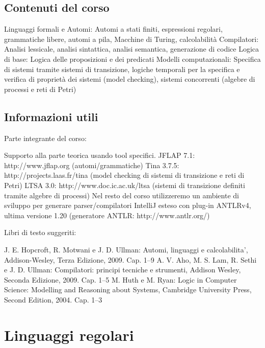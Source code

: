 \documentclass[12pt]{article}
\begin{document}
\subsection{Contenuti del corso}
\begin{outline}
  \1 Linguaggi formali e Automi:
    \2 Automi a stati finiti, espressioni regolari, grammatiche libere, automi a pila, Macchine di Turing, calcolabilità
  \1 Compilatori:
    \2 Analisi lessicale, analisi sintattica, analisi semantica, generazione di codice
  \1 Logica di base:
    \2 Logica delle proposizioni e dei predicati
  \1 Modelli computazionali:
    \2 Specifica di sistemi tramite sistemi di transizione, logiche temporali per la specifica e verifica di proprietà dei sistemi (model checking), sistemi concorrenti (algebre di processi e reti di Petri)
\end{outline}

\subsection{Informazioni utili}
Parte integrante del corso:
\begin{outline}
  \1 Supporto alla parte teorica usando tool specifici.
  \2 JFLAP 7.1: http://www.jflap.org (automi/grammatiche)
  \2 Tina 3.7.5: http://projects.laas.fr/tina
  (model checking di sistemi di transizione e reti di Petri)
  \2 LTSA 3.0: http://www.doc.ic.ac.uk/ltsa
  (sistemi di transizione definiti tramite algebre di processi)
  \1 Nel resto del corso utilizzeremo un ambiente di sviluppo per
  generare parser/compilatori
  \2 IntelliJ esteso con plug-in ANTLRv4, ultima versione 1.20
  (generatore ANTLR: http://www.antlr.org/)
\end{outline}

\newpage
Libri di testo suggeriti:
\begin{outline}
 \1 J. E. Hopcroft, R. Motwani e J. D. Ullman:
Automi, linguaggi e calcolabilita’,
Addison-Wesley, Terza Edizione, 2009. Cap. 1–9
\1 A. V. Aho, M. S. Lam, R. Sethi e J. D. Ullman:
Compilatori: principi tecniche e strumenti,
Addison Wesley, Seconda Edizione, 2009. Cap. 1–5
\1 M. Huth e M. Ryan:
Logic in Computer Science: Modelling and Reasoning about
Systems,
Cambridge University Press, Second Edition, 2004. Cap. 1–3 
\end{outline}

\newpage
\section{Linguaggi regolari}
\end{document}

